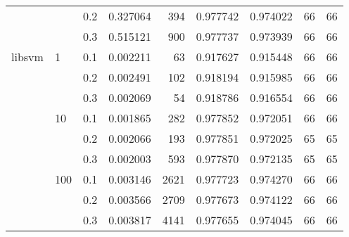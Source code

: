 \begin{table}[h!]
\begin{tabular}{lllrrrrrr}
       &     & 0.2 &  0.327064 &     394 &  0.977742 &  0.974022 &          66 &        66 \\
       &     & 0.3 &  0.515121 &     900 &  0.977737 &  0.973939 &          66 &        66 \\
libsvm & 1   & 0.1 &  0.002211 &      63 &  0.917627 &  0.915448 &          66 &        66 \\
       &     & 0.2 &  0.002491 &     102 &  0.918194 &  0.915985 &          66 &        66 \\
       &     & 0.3 &  0.002069 &      54 &  0.918786 &  0.916554 &          66 &        66 \\
       & 10  & 0.1 &  0.001865 &     282 &  0.977852 &  0.972051 &          66 &        66 \\
       &     & 0.2 &  0.002066 &     193 &  0.977851 &  0.972025 &          65 &        65 \\
       &     & 0.3 &  0.002003 &     593 &  0.977870 &  0.972135 &          65 &        65 \\
       & 100 & 0.1 &  0.003146 &    2621 &  0.977723 &  0.974270 &          66 &        66 \\
       &     & 0.2 &  0.003566 &    2709 &  0.977673 &  0.974122 &          66 &        66 \\
       &     & 0.3 &  0.003817 &    4141 &  0.977655 &  0.974045 &          66 &        66 \\
\bottomrule
\end{tabular}
\end{table}
